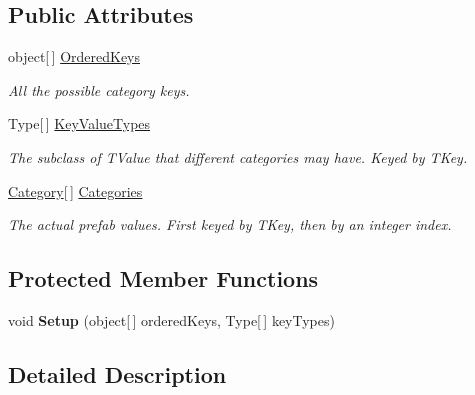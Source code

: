 \subsection*{Public Attributes}
\begin{DoxyCompactItemize}
\item 
object\mbox{[}$\,$\mbox{]} \hyperlink{class_skyrates_1_1_client_1_1_util_1_1_prefab_list_a287ed0c2748a27d810901e9edaef2762}{Ordered\-Keys}
\begin{DoxyCompactList}\small\item\em All the possible category keys. \end{DoxyCompactList}\item 
Type\mbox{[}$\,$\mbox{]} \hyperlink{class_skyrates_1_1_client_1_1_util_1_1_prefab_list_a1f0c9a7b7682fcc2ec806eb6a61aeeaa}{Key\-Value\-Types}
\begin{DoxyCompactList}\small\item\em The subclass of T\-Value that different categories may have. Keyed by T\-Key. \end{DoxyCompactList}\item 
\hyperlink{class_skyrates_1_1_client_1_1_util_1_1_prefab_list_1_1_category}{Category}\mbox{[}$\,$\mbox{]} \hyperlink{class_skyrates_1_1_client_1_1_util_1_1_prefab_list_ac7e03e13d80aa784f26ca91dc37c59f0}{Categories}
\begin{DoxyCompactList}\small\item\em The actual prefab values. First keyed by T\-Key, then by an integer index. \end{DoxyCompactList}\end{DoxyCompactItemize}
\subsection*{Protected Member Functions}
\begin{DoxyCompactItemize}
\item 
\hypertarget{class_skyrates_1_1_client_1_1_util_1_1_prefab_list_a35a04b51ac9f2d1447c8943599d7258a}{void {\bfseries Setup} (object\mbox{[}$\,$\mbox{]} ordered\-Keys, Type\mbox{[}$\,$\mbox{]} key\-Types)}\label{class_skyrates_1_1_client_1_1_util_1_1_prefab_list_a35a04b51ac9f2d1447c8943599d7258a}

\end{DoxyCompactItemize}


\subsection{Detailed Description}




